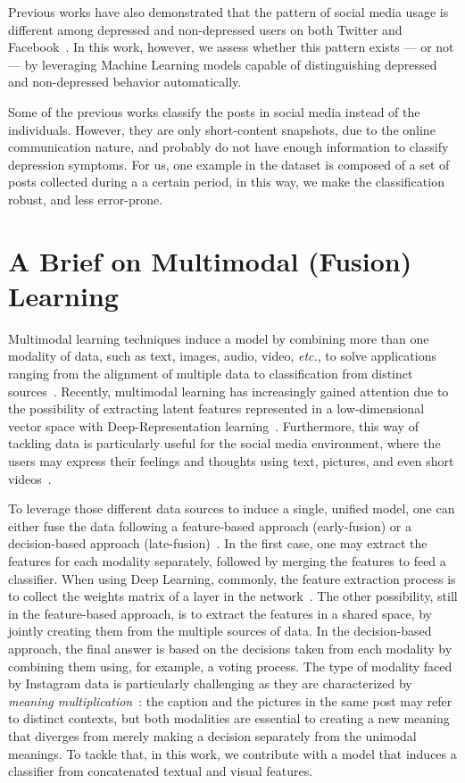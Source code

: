 \documentclass[letterpaper]{article} \usepackage{aaai20}  \usepackage{times}  \usepackage{helvet} \usepackage{courier}  \usepackage[hyphens]{url}  \usepackage{graphicx} \urlstyle{rm} \def\UrlFont{\rm}  \usepackage{graphicx}  \frenchspacing  \setlength{\pdfpagewidth}{8.5in}  \setlength{\pdfpageheight}{11in}  \usepackage[final]{changes}
\begin{document}
Previous works have also demonstrated that the pattern of social media usage is different among depressed and non-depressed users on both Twitter and Facebook~\cite{park2013perception,park2013activities}. In this work, however, we assess whether this pattern exists --- or not --- by leveraging Machine Learning models capable of distinguishing depressed and non-depressed behavior automatically.

Some of the previous works classify the posts in social media instead of the individuals. However, they are only short-content snapshots, due to the online communication nature, and probably do not have enough information to classify depression symptoms. For us, one example in the dataset is composed of a set of posts collected during a a certain period, in this way, we make the classification robust, and less error-prone.



\section{A Brief on Multimodal (Fusion) Learning}\label{sec:3}
Multimodal learning techniques induce a model by combining more than one modality of data, such as text, images, audio, video, \textit{etc.}, to solve applications ranging from the alignment of multiple data to classification from distinct sources~\cite{ngiam2011multimodal}. Recently, multimodal learning has increasingly gained attention due to the possibility of extracting latent features represented in a low-dimensional vector space with Deep-Representation learning~\cite{ramachandram2017deep}. Furthermore, this way of tackling data is particularly useful for the social media environment, where the users may express their feelings and thoughts using text, pictures, and even short videos~\cite{DBLP:journals/corr/abs-1708-02099}.

To leverage those different data sources to induce a single, unified model, one can either fuse the data following a feature-based approach (early-fusion) or a decision-based approach (late-fusion)~\cite{baltruvsaitis2018multimodal}. In the first case, one may extract the features for each modality separately, followed by merging the features to feed a classifier. When using Deep Learning, commonly, the feature extraction process is to collect the weights matrix of a layer in the network~\cite{ramachandram2017deep}. The other possibility, still in the feature-based approach, is to extract the features in a shared space, by jointly creating them from the multiple sources of data. In the decision-based approach, the final answer is based on the decisions taken from each modality by combining them using, for example, a voting process. 
The type of modality faced by Instagram data is particularly challenging as they are characterized by \emph{meaning multiplication}~\cite{bateman2014text}: the caption and the pictures in the same post may refer to distinct contexts, but both modalities are essential to creating a new meaning that diverges from merely making a decision separately from the unimodal meanings. To tackle that, in this work, we contribute with a model that induces a classifier from concatenated textual and visual features.
\end{document}
